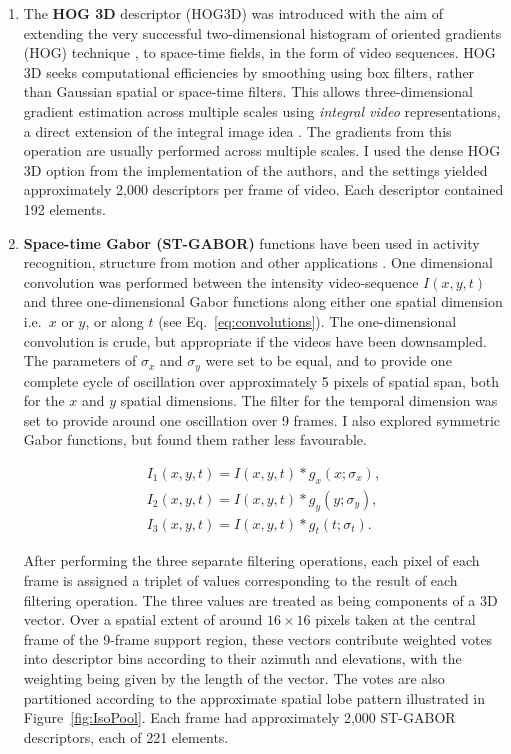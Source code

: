 \begin{enumerate}
\item The \textbf{HOG 3D} descriptor (HOG3D) \citep{Klaser2008} was introduced with the aim of extending the very successful two-di\-men\-sio\-nal histogram of oriented gradients (HOG) technique \citep{Dalal}, to space-time fields, in the form of video sequences.  HOG 3D seeks computational efficiencies by smoothing using box filters, rather than Gaussian spatial or space-time filters.  This allows three-dimensional gradient estimation across multiple scales using {\em integral video} representations, a direct extension of the integral image idea \citep{Viola2001}.  The gradients from this operation are usually performed across multiple scales.  I used the dense HOG 3D option from the implementation of the authors, and the settings yielded approximately 2,000  descriptors per frame of video. Each descriptor contained 192 elements.


\item \textbf{Space-time Gabor (ST-GABOR)} functions have been used in activity recognition, structure from motion and other applications \cite{Bregonzio2009}.  One dimensional convolution was performed between the intensity video-sequence $I(x,y,t)$ and three one-dimensional Gabor functions along either one spatial dimension i.e.\ $x$ or $y$, or along $t$ (see Eq.~\ref{eq:convolutions}).  The one-dimensional convolution  is crude, but appropriate if the videos have been downsampled. The parameters of $\sigma_x$ and $\sigma_y$ were set to be equal, and to provide one complete cycle of oscillation over approximately 5 pixels of spatial span, both for the $x$ and $y$ spatial dimensions. The filter for the temporal dimension was set to provide  around one oscillation over 9 frames.  I also explored symmetric Gabor functions, but found them rather less favourable.


\begin{equation}
\begin{array}{c}
I_1(x,y,t) = I(x,y,t) \ast g_x(x;\sigma_x), \\

I_2(x,y,t) = I(x,y,t) \ast g_y(y;\sigma_y), \\

I_3(x,y,t) = I(x,y,t) \ast g_t(t;\sigma_t).

\end{array}
\label{eq:convolutions}
\end{equation}


After performing the three separate filtering operations, each pixel of each frame is assigned a triplet of values corresponding to the result of each filtering operation.  The three values are treated as being components of a 3D vector.  Over a spatial extent of around $16 \times 16$ pixels taken at the central frame of the 9-frame support region, these vectors contribute weighted votes into descriptor bins according to their azimuth and elevations, with the weighting being given by the length of the vector.  The votes are also partitioned according to the approximate spatial lobe pattern illustrated in Figure~\ref{fig:IsoPool}. Each frame had approximately 2,000 ST-GABOR descriptors, each of 221 elements.



\end{enumerate}
